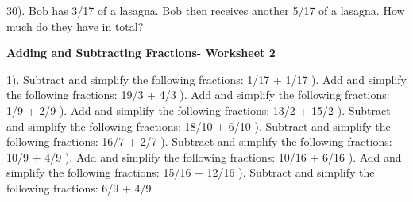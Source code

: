 \documentclass{article}%
\begin{document}
30). Bob has 3/17 of a lasagna. Bob then receives another 5/17 of a lasagna. How much do they have in total?%
\newline%
\newline%
\newline%
\pagebreak%
\large%
\begin{center}%
\textbf{Adding and Subtracting Fractions- Worksheet 2}%
\newline%
\end{center} \normalsize%
1). Subtract and simplify the following fractions: 1/17 + 1/17%
\newline%
\newline%
). Add and simplify the following fractions: 19/3 + 4/3%
\newline%
\newline%
). Add and simplify the following fractions: 1/9 + 2/9%
\newline%
\newline%
). Add and simplify the following fractions: 13/2 + 15/2%
\newline%
\newline%
). Subtract and simplify the following fractions: 18/10 + 6/10%
\newline%
\newline%
). Subtract and simplify the following fractions: 16/7 + 2/7%
\newline%
\newline%
). Subtract and simplify the following fractions: 10/9 + 4/9%
\newline%
\newline%
). Add and simplify the following fractions: 10/16 + 6/16%
\newline%
\newline%
). Add and simplify the following fractions: 15/16 + 12/16%
\newline%
\newline%
). Subtract and simplify the following fractions: 6/9 + 4/9%
\newline%
\newline%
\newline%
\end{document}
